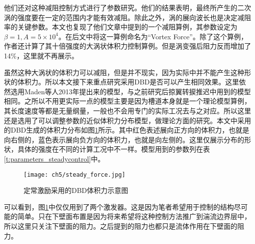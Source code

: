 他们还对这种减阻控制方式进行了参数研究。他们的结果表明，最终所产生的二次涡的强度要在一定的范围内才能有效减阻。除此之外，涡的展向波长也是决定减阻率的关键参数。本文也复现了他们文章中提到的一个减阻算例，其参数设定为$\beta=1,A=5\times10^4$。在后文中将这一算例命名为“Vortex Force”。除了这个算例，作者还计算了其十倍强度的大涡状体积力控制算例。但是涡变强后阻力反而增加了14\%，这里就不再展示。

虽然这种大涡状的体积力可以减阻，但是并不现实，因为实际中并不能产生这种形状的体积力。所以本文接下来重点研究采用DBD是否可以产生相同效果。这里依然选用Maden等人2013年提出来的模型，与之前研究后掠翼转捩推迟中用到的模型相同。之所以不用更实际一点的模型主要是因为槽道本身就是一个理论模型算例，其长度速度等都是无量纲量，一般也不会用专门的实际工况去与之对应。所以这里还是选用了可以调整参数的近似体积力分布模型，做理论方面的研究。本文中采用的DBD生成的体积力分布如图\ref{f:steady_force}所示。其中红色表述展向正方向的体积力，也就是向右侧的，蓝色表示展向负方向的体积力，也就是向左侧的。这里仅展示分布的形状，具体的强度在不同的计算工况中不一样。模型用到的参数列在表\ref{t:parameters_steadycontrol}中。
\begin{figure}[htb]
  \centering
  \texttt{[image: ch5/steady\_force.jpg]}
  \caption{定常激励采用的DBD体积力示意图}\label{f:steady_force}
\end{figure}

可以看到，图\ref{f:steady_force}中仅仅用到了两个激发器。这是因为笔者希望用于控制的结构尽可能的简单。只在下壁面布置是因为将来希望将这种控制方法推广到湍流边界层中，所以这里只关注下壁面的阻力。之后提到的阻力也都只是流体作用在下壁面的阻力。

